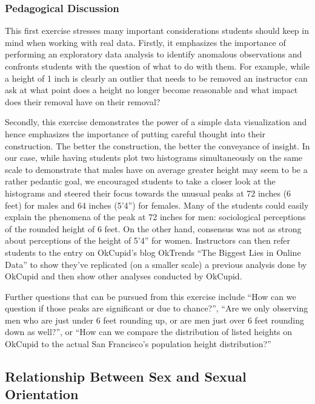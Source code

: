 \documentclass{article}\usepackage[]{graphicx}\usepackage[]{color}
\begin{document}
\subsubsection{Pedagogical Discussion}
This first exercise stresses many important considerations students should keep in mind when working with real data.  Firstly, it emphasizes the importance of performing an exploratory data analysis to identify anomalous observations and confronts students with the question of what to do with them.  For example, while a height of 1 inch is clearly an outlier that needs to be removed an instructor can ask at what point does a height no longer become reasonable and what impact does their removal have on their removal?

Secondly, this exercise demonstrates the power of a simple data visualization and hence emphasizes the importance of putting careful thought into their construction.  The better the construction, the better the conveyance of insight.  In our case, while having students plot two histograms simultaneously on the same scale to demonstrate that males have on average greater height may seem to be a rather pedantic goal, we encouraged students to take a closer look at the histograms and steered their focus towards the unusual peaks at 72 inches (6 feet) for males and 64 inches (5'4'') for females.  Many of the students could easily explain the phenomena of the peak at 72 inches for men: sociological perceptions of the rounded height of 6 feet.  On the other hand, consensus was not as strong about perceptions of the height of 5'4'' for women.  Instructors can then refer students to the entry on OkCupid's blog OkTrends ``The Biggest Lies in Online Data''\cite{OkTrendsLies} to show they've replicated (on a smaller scale) a previous analysis done by OkCupid and then show other analyses conducted by OkCupid.

Further questions that can be pursued from this exercise include ``How can we question if those peaks are significant or due to chance?'', ``Are we only observing men who are just under 6 feet rounding up, or are men just over 6 feet rounding down as well?'', or ``How can we compare the distribution of listed heights on OkCupid to the actual San Francisco's population height distribution?''







\subsection{Relationship Between Sex and Sexual Orientation}
\end{document}
